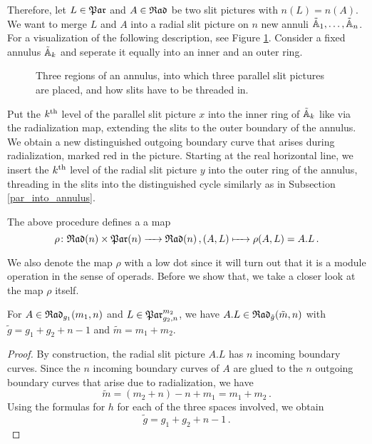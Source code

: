 Therefore, let $L \in \mathfrak{Par}$ and $A \in \mathfrak{Rad}$ be two slit pictures with $n(L) = n(A)$.
We want to merge $L$ and $A$ into a radial slit picture on $n$ new annuli $\tilde {\mathbb A}_1, \dotsc, \tilde {\mathbb A}_n$.
For a visualization of the following description, see Figure \ref{par_operates_on_rad}.
Consider a fixed annulus $\tilde {\mathbb A}_k$ and seperate it equally into an inner and an outer ring.
\begin{figure}[ht]
  \centering
  \caption{\label{par_operates_on_rad} Three regions of an annulus, into which three parallel slit pictures are placed, and how slits have to be threaded in.}
\end{figure}
Put the $k^{\text{th}}$ level of the parallel slit picture $x$ into the inner ring of $\tilde {\mathbb A}_k$ like via the radialization map, extending the slits to the outer boundary of the annulus. 
We obtain a new distinguished outgoing boundary curve that arises during radialization, marked red in the picture.
Starting at the real horizontal line, we insert the $k^{\text{th}}$ level of the radial slit picture $y$ into the outer ring of the annulus,
threading in the slits into the distinguished cycle similarly as in Subsection \ref{par_into_annulus}.

\begin{defi}
   The above procedure defines a a map
   \[
      \rho \colon \mathfrak{Rad}(n) \times \mathfrak{Par}(n) \xrightarrow{\hspace{6pt}{}\hspace{6pt}} \mathfrak{Rad}(n)\,, (A, L) \xmapsto{\hspace{6pt}{}\hspace{6pt}} \rho(A, L) = A.L\,.
   \]
\end{defi}

We also denote the map $\rho$ with a low dot since it will turn out that it is a module operation in the sense of operads.
Before we show that, we take a closer look at the map $\rho$ itself.

\begin{prop}
   For $A \in \mathfrak{Rad}_{g_1}(m_1, n)$ and $L \in \mathfrak{Par}_{g_2, n}^{m_2}$, we have $A.L \in \mathfrak{Rad}_{\tilde g}(\tilde m, n)$ with $\tilde g = g_1 + g_2 + n - 1$ and $\tilde m = m_1 + m_2$.
\begin{proof}
   By construction, the radial slit picture $A.L$ has $n$ incoming boundary curves.
   Since the $n$ incoming boundary curves of $A$ are glued to the $n$ outgoing boundary curves that arise due to radialization, we have 
   \[
      \tilde m = (m_2 + n) - n + m_1 = m_1 + m_2\,.
   \]
   Using the formulas for $h$ for each of the three spaces involved, we obtain
   \[
      \tilde g = g_1 + g_2 + n - 1\,.
   \]
\end{proof}
\end{prop}

